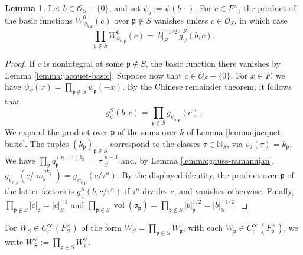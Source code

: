 \documentclass[reqno]{amsart}
\DeclareMathOperator{\vol}{vol}
\theoremstyle{plain}
\theoremstyle{definition}
\theoremstyle{itplain}
\newtheorem{lemma}[theorem]{Lemma}
\numberwithin{equation}{section}
\numberwithin{theorem}{section}
\begin{document}
\begin{lemma}\label{lemma:product-of-basic-functions}
  Let $b \in \mathcal{O}_S - \{0\}$, and set $\psi_b := \psi(b \, \cdot)$.  For $c \in F^\times$, the product of the basic functions $W_{\psi_{b,\mathfrak{p}}}^0(c)$ over $\mathfrak{p} \notin S$ vanishes unless $c \in \mathcal{O}_S$, in which case
  \begin{equation*}
    \prod_{\mathfrak{p} \notin S} W_{\psi_{b,\mathfrak{p}}}^0(c) = \lvert b \rvert_S^{-1/2} \, \tilde{g}_\psi^S(b, c).
  \end{equation*}
\end{lemma}
\begin{proof}
  If $c$ is nonintegral at some $\mathfrak{p} \notin S$, the basic function there vanishes by Lemma \ref{lemma:jacquet-basic}.  Suppose now that $c \in \mathcal{O}_S - \{0\}$.  For $x \in F$, we have $\psi_S(x) = \prod_{\mathfrak{p} \notin S} \psi_{\mathfrak{p}}(-x)$.  By the Chinese remainder theorem, it follows that
  \begin{equation*}
    g_\psi^S(b, c) = \prod_{\mathfrak{p} \notin S} g_{\psi_{b,\mathfrak{p}}}(c).
  \end{equation*}
  We expand the product over $\mathfrak{p}$ of the sums over $k$ of Lemma \ref{lemma:jacquet-basic}.  The tuples $(k_{\mathfrak{p}})_{\mathfrak{p} \notin S}$ correspond to the classes $\tau \in \mathbb{N}_S$, via $v_{\mathfrak{p}}(\tau) = k_{\mathfrak{p}}$.  We have $\prod_{\mathfrak{p}} q_{\mathfrak{p}}^{(n-1) k_{\mathfrak{p}}} = \lvert \tau \rvert_S^{n-1}$ and, by Lemma \ref{lemma:gauss-ramanujan}, $g_{\psi_{b,\mathfrak{p}}}(c / \varpi_{\mathfrak{p}}^{n k_{\mathfrak{p}}}) = g_{\psi_{b,\mathfrak{p}}}(c / \tau^n)$.  By the displayed identity, the product over $\mathfrak{p}$ of the latter factors is $g_\psi^S(b, c / \tau^n)$ if $\tau^n$ divides $c$, and vanishes otherwise.  Finally, $\prod_{\mathfrak{p} \notin S} \lvert c \rvert_{\mathfrak{p}} = \lvert c \rvert_S^{-1}$ and $\prod_{\mathfrak{p} \notin S} \vol(\mathfrak{o}_{\mathfrak{p}}) = \prod_{\mathfrak{p} \notin S} \lvert b \rvert_{\mathfrak{p}}^{1/2} = \lvert b \rvert_S^{-1/2}$.
\end{proof}

For $W_S \in C_c^\infty(F_S^\times)$ of the form $W_S = \prod_{\mathfrak{p} \in S} W_{\mathfrak{p}}$, with each $W_{\mathfrak{p}} \in C_c^\infty(F_{\mathfrak{p}}^\times)$, we write $W_S^\vee := \prod_{\mathfrak{p} \in S} W_{\mathfrak{p}}^\vee$.
\end{document}
